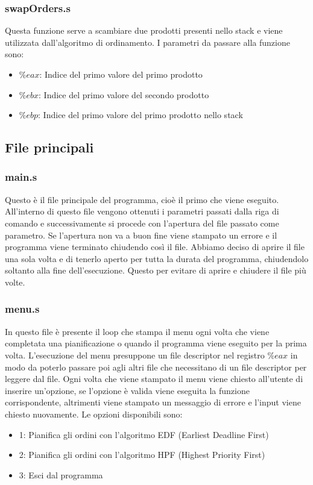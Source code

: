 \documentclass[a4paper]{article}
\begin{document}
\subsubsection{swapOrders.s}
\label{swapOrders}
Questa funzione serve a scambiare due prodotti presenti nello stack e viene utilizzata
dall'algoritmo di ordinamento. I parametri da passare alla funzione sono:
\begin{itemize}
	\item \( \%eax \): Indice del primo valore del primo prodotto
	\item \( \%ebx \): Indice del primo valore del secondo prodotto
	\item \( \%ebp \): Indice del primo valore del primo prodotto nello stack
\end{itemize}

\subsection{File principali}
\subsubsection{main.s}
Questo è il file principale del programma, cioè il primo che viene eseguito. All'interno
di questo file vengono ottenuti i parametri passati dalla riga di comando e successivamente
si procede con l'apertura del file passato come parametro. Se l'apertura non va a buon fine
viene stampato un errore e il programma viene terminato chiudendo così il file. Abbiamo
deciso di aprire il file una sola volta e di tenerlo aperto per tutta la durata del programma,
chiudendolo soltanto alla fine dell'esecuzione. Questo per evitare di aprire e chiudere il file
più volte.

\subsubsection{menu.s}
In questo file è presente il loop che stampa il menu ogni volta che viene completata una
pianificazione o quando il programma viene eseguito per la prima volta. L'esecuzione del
menu presuppone un file descriptor nel registro \( \%eax \) in modo da poterlo passare
poi agli altri file che necessitano di un file descriptor per leggere dal file. Ogni
volta che viene stampato il menu viene chiesto all'utente di inserire un'opzione, se
l'opzione è valida viene eseguita la funzione corrispondente, altrimenti viene stampato
un messaggio di errore e l'input viene chiesto nuovamente. Le opzioni disponibili sono:
\begin{itemize}
	\item 1: Pianifica gli ordini con l'algoritmo EDF (Earliest Deadline First)
	\item 2: Pianifica gli ordini con l'algoritmo HPF (Highest Priority First)
	\item 3: Esci dal programma
\end{itemize}
\end{document}
